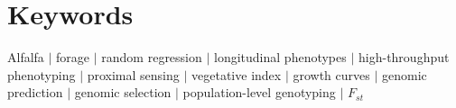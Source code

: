 \documentclass[12pt, letterpaper]{article}
\begin{document}
\printbibliography


\section{Keywords}
Alfalfa $|$ forage $|$ random regression $|$ longitudinal phenotypes $|$ high-throughput phenotyping $|$ proximal sensing $|$ vegetative index $|$ growth curves $|$ genomic prediction $|$ genomic selection $|$ population-level genotyping $|$ $F_{st}$


\end{document}
